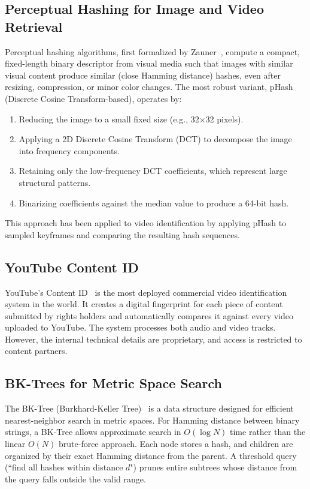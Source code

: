 \subsection{Perceptual Hashing for Image and Video Retrieval}
Perceptual hashing algorithms, first formalized by Zauner~\cite{zauner2010}, compute a compact, fixed-length binary descriptor from visual media such that images with similar visual content produce similar (close Hamming distance) hashes, even after resizing, compression, or minor color changes. The most robust variant, pHash (Discrete Cosine Transform-based), operates by:
\begin{enumerate}
  \item Reducing the image to a small fixed size (e.g., 32$\times$32 pixels).
  \item Applying a 2D Discrete Cosine Transform (DCT) to decompose the image into frequency components.
  \item Retaining only the low-frequency DCT coefficients, which represent large structural patterns.
  \item Binarizing coefficients against the median value to produce a 64-bit hash.
\end{enumerate}
This approach has been applied to video identification by applying pHash to sampled keyframes and comparing the resulting hash sequences.

\subsection{YouTube Content ID}
YouTube's Content ID~\cite{youtube2007} is the most deployed commercial video identification system in the world. It creates a digital fingerprint for each piece of content submitted by rights holders and automatically compares it against every video uploaded to YouTube. The system processes both audio and video tracks. However, the internal technical details are proprietary, and access is restricted to content partners.

\subsection{BK-Trees for Metric Space Search}
The BK-Tree (Burkhard-Keller Tree)~\cite{bk1973} is a data structure designed for efficient nearest-neighbor search in metric spaces. For Hamming distance between binary strings, a BK-Tree allows approximate search in $O(\log N)$ time rather than the linear $O(N)$ brute-force approach. Each node stores a hash, and children are organized by their exact Hamming distance from the parent. A threshold query (``find all hashes within distance $d$") prunes entire subtrees whose distance from the query falls outside the valid range.

